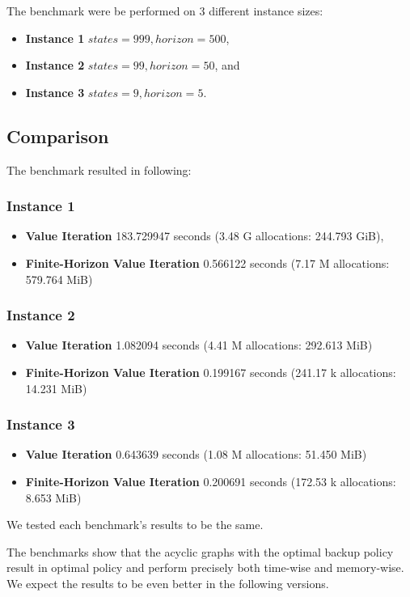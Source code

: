 The benchmark were be performed on 3 different instance sizes:
\begin{itemize}
    \item \textbf{Instance 1} $states = 999, horizon = 500$,
    \item \textbf{Instance 2} $states = 99, horizon = 50$, and
    \item \textbf{Instance 3} $states = 9, horizon = 5$.
\end{itemize}

\subsection{Comparison}

The benchmark resulted in following:

\subsubsection{Instance 1}

\begin{itemize}
    \item \textbf{Value Iteration} 183.729947 seconds (3.48 G allocations: 244.793 GiB),
    \item \textbf{Finite-Horizon Value Iteration}   0.566122 seconds (7.17 M allocations: 579.764 MiB)
\end{itemize}

\subsubsection{Instance 2}

\begin{itemize}
    \item \textbf{Value Iteration} 1.082094 seconds (4.41 M allocations: 292.613 MiB)
    \item \textbf{Finite-Horizon Value Iteration}   0.199167 seconds (241.17 k allocations: 14.231 MiB)
\end{itemize}

\subsubsection{Instance 3}

\begin{itemize}
    \item \textbf{Value Iteration} 0.643639 seconds (1.08 M allocations: 51.450 MiB)
    \item \textbf{Finite-Horizon Value Iteration}   0.200691 seconds (172.53 k allocations: 8.653 MiB)
\end{itemize}  

We tested each benchmark's results to be the same.

The benchmarks show that the acyclic graphs with the optimal backup policy result in optimal policy and perform precisely both time-wise and memory-wise. We expect the results to be even better in the following versions.